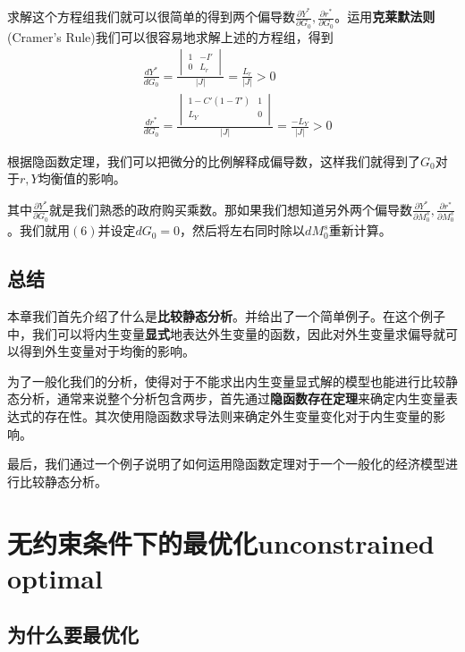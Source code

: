 \documentclass[UTF8,12pt]{ctexart}
\numberwithin{equation}{section} %
\numberwithin{figure}{section}
\numberwithin{table}{section}
\begin{document}
	求解这个方程组我们就可以很简单的得到两个偏导数$\frac{\partial Y^*}{\partial G_0},\frac{\partial r^*}{\partial G_0}$。运用\textbf{克莱默法则}(Cramer's Rule)我们可以很容易地求解上述的方程组，得到
	\begin{equation}
		\begin{aligned}
			&\frac{dY^*}{dG_0} = \frac{
				\begin{vmatrix}
					1 & -I'\\
					0 & L_r
				\end{vmatrix}
			}{|J|}
			=\frac{L_r}{|J|} > 0 \\			
			&\frac{dr^*}{dG_0} = \frac{
				\begin{vmatrix}
					1-C'(1-T') & 1  \\
					L_Y & 0  \\
				\end{vmatrix}
			}{|J|}
			=\frac{-L_Y}{|J|} > 0
		\end{aligned}
	\end{equation}
	
	根据隐函数定理，我们可以把微分的比例解释成偏导数，这样我们就得到了$G_0$对于$r,Y$均衡值的影响。
	
	其中$\frac{\partial Y^*}{\partial G_0}$就是我们熟悉的政府购买乘数。那如果我们想知道另外两个偏导数$\frac{\partial Y^*}{\partial M_0^s},\frac{\partial r^*}{\partial M_0^s}$。我们就用$(6)$并设定$dG_0 = 0$，然后将左右同时除以$dM^s_0$重新计算。
	
	\subsection{总结}
	本章我们首先介绍了什么是\textbf{比较静态分析}。并给出了一个简单例子。在这个例子中，我们可以将内生变量\textbf{显式}地表达外生变量的函数，因此对外生变量求偏导就可以得到外生变量对于均衡的影响。
	
	为了一般化我们的分析，使得对于不能求出内生变量显式解的模型也能进行比较静态分析，通常来说整个分析包含两步，首先通过\textbf{隐函数存在定理}来确定内生变量表达式的存在性。其次使用隐函数求导法则来确定外生变量变化对于内生变量的影响。
	
	最后，我们通过一个例子说明了如何运用隐函数定理对于一个一般化的经济模型进行比较静态分析。
	
	\newpage
	\section{无约束条件下的最优化unconstrained optimal} 
	\subsection{为什么要最优化}
	
\end{document}
